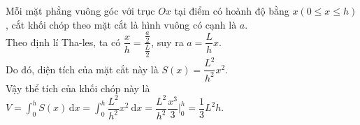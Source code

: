 \begin{bt}
{		Mỗi mặt phẳng vuông góc với trục $Ox$ tại điểm có hoành độ bằng $x(0 \leq x \leq h)$, cắt khối chóp theo mặt cắt là hình vuông có cạnh là $a$.\\
		Theo định lí Tha-les, ta có $\dfrac{x}{h}=\dfrac{\frac{a}{2}}{\frac{L}{2}}$, suy ra $a=\dfrac{L}{h} x$.\\
		Do đó, diện tích của mặt cắt này là $S(x)=\dfrac{L^2}{h^2} x^2$.\\
		Vậy thể tích của khối chóp này là $V=\displaystyle\int_0^h S(x) \mathrm{\,d} x=\displaystyle\int_0^h \dfrac{L^2}{h^2} x^2 \mathrm{~d}x=\left.\dfrac{L^2}{h^2} \dfrac{x^3}{3}\Bigg|_0^h \right. =\dfrac{1}{3} L^2h$.
	}
\end{bt}
